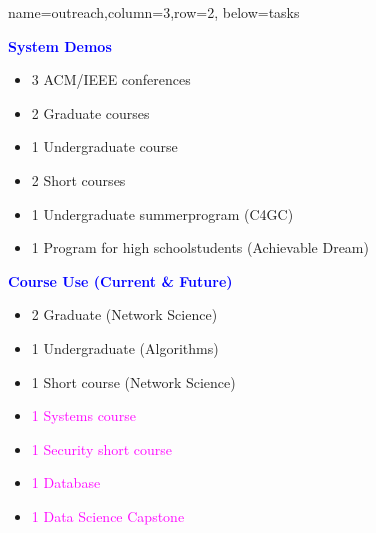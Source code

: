 \documentclass[landscape,paperwidth=70in,paperheight=46in,fontscale=0.225]{baposter} %
\begin{document}
\begin{poster}
          {name=outreach,column=3,row=2, below=tasks}{
\begin{minipage}[t]{0.48 \textwidth}
\textcolor{blue}{\textbf{System Demos}}
\medskip
\begin{itemize}[leftmargin=*,noitemsep,topsep=0pt]
    \item 3 ACM/IEEE conferences  \smallskip
    \item 2 Graduate courses   \smallskip 
    \item 1 Undergraduate course  \smallskip
    \item 2 Short courses  \smallskip
    \item 1 Undergraduate summer\newline program (C4GC)  \smallskip
    \item 1 Program for high school\newline students 
          (Achievable Dream) %
\end{itemize}
\end{minipage}
\quad
\begin{minipage}[t]{0.48 \textwidth}
\textcolor{blue}{\textbf{Course Use (Current \& Future)}}\
  \medskip
\begin{itemize}[leftmargin=*,noitemsep,topsep=0pt]
    \item 2 Graduate (Network Science)    \smallskip
    \item 1 Undergraduate (Algorithms)   \smallskip
    \item 1 Short course (Network Science)   \smallskip
    \item \textcolor{magenta}{1 Systems course}  \smallskip
    \item \textcolor{magenta}{1 Security short course}  \smallskip
    \item \textcolor{magenta}{1 Database}  \smallskip
    \item \textcolor{magenta}{1 Data Science Capstone}
\end{itemize}
\end{minipage}
\qquad

\medskip

}
\end{poster}
\end{document}
